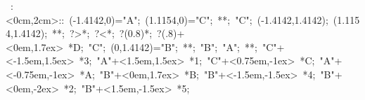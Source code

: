 \hbox{
\xy    <2cm,0cm>:<0cm,2cm>::
       (-1.4142,0)="A"; (1.1154,0)="C";  **\dir{-}; "C";
       (-1.4142,1.4142); (1.1154,1.4142);  **\dir{--}; ?>*\dir{>}; 
                ?<*\dir{<}; ?(0.8)*{\bullet}; ?(.8)+<0em,1.7ex> *{D}; "C";
       (0,1.4142)="B"; **\dir{-}; "B"; "A"; **\dir{-};
       "C"+<-1.5em,1.5ex> *{3};
       "A"+<1.5em,1.5ex> *{1};
       "C"+<0.75em,-1ex> *{C};
       "A"+<-0.75em,-1ex> *{A};
       "B"+<0em,1.7ex> *{B};
       "B"+<-1.5em,-1.5ex> *{4};
       "B"+<0em,-2ex> *{2};
       "B"+<1.5em,-1.5ex> *{5};
       \endxy}
	   
